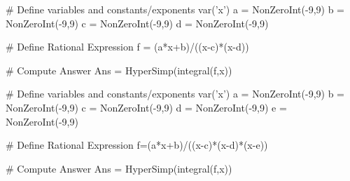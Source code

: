 
\begin{sagesilent}
# Define variables and constants/exponents
var('x')
a = NonZeroInt(-9,9)
b = NonZeroInt(-9,9)
c = NonZeroInt(-9,9)
d = NonZeroInt(-9,9)


# Define Rational Expression
f = (a*x+b)/((x-c)*(x-d))

# Compute Answer
Ans = HyperSimp(integral(f,x))
\end{sagesilent}






\begin{sagesilent}
# Define variables and constants/exponents
var('x')
a = NonZeroInt(-9,9)
b = NonZeroInt(-9,9)
c = NonZeroInt(-9,9)
d = NonZeroInt(-9,9)
e = NonZeroInt(-9,9)


# Define Rational Expression
f=(a*x+b)/((x-c)*(x-d)*(x-e))

# Compute Answer
Ans = HyperSimp(integral(f,x))
\end{sagesilent}


